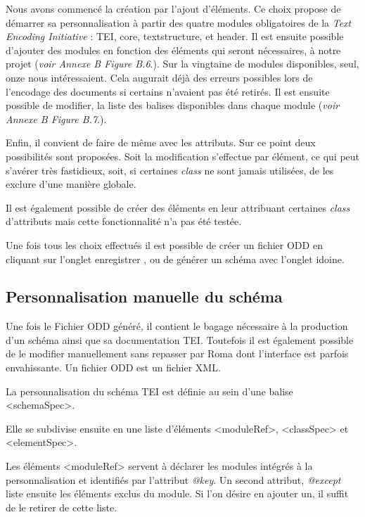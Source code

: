 \documentclass[12pt,a4paper]{book} %
\begin{document}
Nous avons commencé la création par l'ajout d'éléments. Ce choix propose de démarrer sa personnalisation à partir des quatre modules obligatoires de la \textit{Text Encoding Initiative} : TEI, core, textstructure, et header.
Il est ensuite possible d'ajouter des modules en fonction des éléments qui seront nécessaires, à notre projet (\textit{voir Annexe B Figure B.6}.). Sur la vingtaine de modules disponibles, seul, onze nous intéressaient. Cela augurait déjà des erreurs possibles lors de l'encodage des documents si certains n'avaient pas été retirés.
Il est ensuite possible de modifier, la liste des balises disponibles dans chaque module (\textit{voir Annexe B Figure B.7}.).

Enfin, il convient de faire de même avec les attributs. Sur ce point deux possibilités sont proposées. Soit la modification s'effectue par élément, ce qui peut s'avérer très fastidieux, soit, si certaines \textit{class} ne sont jamais utilisées, de les exclure d'une manière globale.

Il est également possible de créer des éléments en leur attribuant certaines \textit{class} d'attributs mais cette fonctionnalité n'a pas été testée.

Une fois tous les choix effectués il est possible de créer un fichier ODD en cliquant sur l'onglet \og enregistrer \fg{}, ou de générer un schéma avec l'onglet idoine.

\subsection{Personnalisation manuelle du schéma}

Une fois le Fichier ODD généré, il contient le bagage nécessaire à la production d'un schéma ainsi que sa documentation TEI. Toutefois il est également possible de le modifier manuellement sans repasser par Roma dont l'interface est parfois envahissante. Un fichier ODD est un fichier XML.

La personnalisation du schéma TEI est définie au sein d'une balise <schemaSpec>.

Elle se subdivise ensuite en une liste d'éléments <moduleRef>,  <classSpec> et <elementSpec>.
\medskip

Les éléments <moduleRef> servent à déclarer les modules intégrés à la  personnalisation et identifiés par l'attribut \textit{@key}. Un second attribut, \textit{@except} liste ensuite les éléments exclus du module. Si l'on désire en ajouter un, il suffit de le retirer de cette liste.
\bigskip
\end{document}
